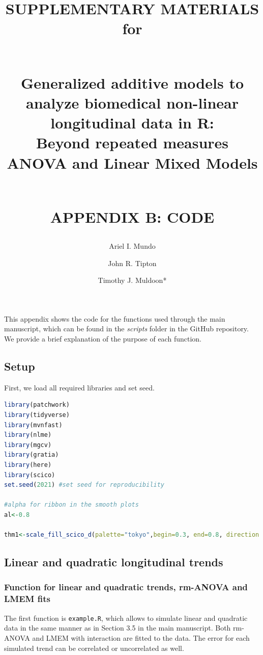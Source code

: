 \documentclass[
]{article}
\title{SUPPLEMENTARY MATERIALS for\\
\strut \\
\textbf{Generalized additive models to analyze biomedical non-linear longitudinal data in R:}\\
Beyond repeated measures ANOVA and Linear Mixed Models\\
\strut \\
APPENDIX B: CODE}
\author{}
\date{\vspace{-2.5em}}
\author{Ariel I. Mundo \orcidaffila{}}
\author{John R. Tipton \orcidaffilb{}}
\author{Timothy J. Muldoon*}
\affil{tmuldoon@uark.edu}
\newcommand{\passthrough}[1]{#1}
\begin{document}
\maketitle

\newpage


This appendix shows the code for the functions used through the main manuscript, which can be found in the \emph{scripts} folder in the GitHub repository. We provide a brief explanation of the purpose of each function.

\hypertarget{setup}{%
\subsection{Setup}\label{setup}}

First, we load all required libraries and set seed.

\begin{lstlisting}[language=R]
library(patchwork)
library(tidyverse)
library(mvnfast)
library(nlme)
library(mgcv)
library(gratia)
library(here)
library(scico)
set.seed(2021) #set seed for reproducibility

#alpha for ribbon in the smooth plots
al<-0.8

thm1<-scale_fill_scico_d(palette="tokyo",begin=0.3, end=0.8, direction = -1, aesthetics = c("colour","fill"))
\end{lstlisting}

\hypertarget{linear-and-quadratic-longitudinal-trends}{%
\subsection{Linear and quadratic longitudinal trends}\label{linear-and-quadratic-longitudinal-trends}}

\hypertarget{function-for-linear-and-quadratic-trends-rm-anova-and-lmem-fits}{%
\subsubsection{Function for linear and quadratic trends, rm-ANOVA and LMEM fits}\label{function-for-linear-and-quadratic-trends-rm-anova-and-lmem-fits}}

The first function is \passthrough{\lstinline!example.R!}, which allows to simulate linear and quadratic data in the same manner as in Section 3.5 in the main manuscript. Both rm-ANOVA and LMEM with interaction are fitted to the data. The error for each simulated trend can be correlated or uncorrelated as well.
\end{document}

